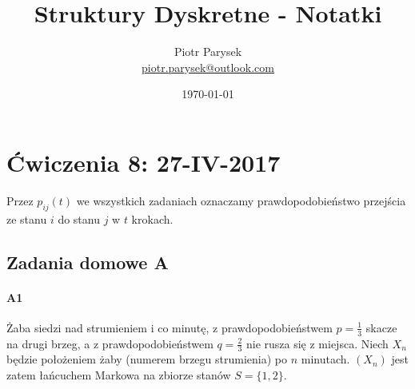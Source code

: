 \documentclass[a4paper,12pt]{article}
\title{Struktury Dyskretne - Notatki}
\author{Piotr Parysek\\
\href{mailto:piotr.parysek@outlook.com}{piotr.parysek@outlook.com} }
\date{\today}
\theoremstyle{definition}%
\theoremstyle{definition}
\theoremstyle{problem}
\begin{document}
\maketitle

\tableofcontents
\section{Ćwiczenia 8: 27-IV-2017}
Przez $p_{ij}(t)$ we wszystkich zadaniach oznaczamy prawdopodobieństwo przejścia ze stanu $i$ do stanu $j$ w $t$ krokach.

\subsection{Zadania domowe A}
\paragraph{A1} Żaba siedzi nad strumieniem i co minutę,
z prawdopodobieństwem $p = \frac{1}{3}$ skacze na drugi brzeg, a z prawdopodobieństwem $q = \frac{2}{3}$ nie rusza się z miejsca. Niech $X_n$ będzie położeniem żaby (numerem brzegu strumienia) po $n$ minutach. $(X_n)$ jest zatem łańcuchem Markowa na zbiorze stanów $S = \{1, 2\}$.
\end{document}
